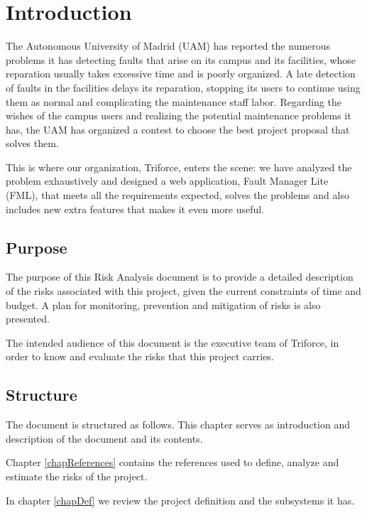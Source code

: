 \documentclass[11pt]{report}
\newcounter{risks}[subsection]
\begin{document}
\newpage
\tableofcontents
\newpage
\chapter{Introduction}


\label{chapIntroduction}

The Autonomous University of Madrid (UAM) has reported the numerous problems it has detecting faults that arise on its campus and its facilities, whose reparation usually takes excessive time and is poorly organized. A late detection of faults in the facilities delays its reparation, stopping its users to continue using them as normal and complicating the maintenance staff labor. Regarding the wishes of the campus users and realizing the potential maintenance problems it has, the UAM has organized a contest to choose the best project proposal that solves them.

This is where our organization, Triforce, enters the scene: we have analyzed the problem exhaustively and designed a web application, Fault Manager Lite (FML), that meets all the requirements expected, solves the problems and also includes new extra features that makes it even more useful.

\section{Purpose}

The purpose of this Risk Analysis document is to provide a detailed description of the risks associated with this project, given the current constraints of time and budget. A plan for monitoring, prevention and mitigation of risks is also presented.

The intended audience of this document is the executive team of Triforce, in order to know and evaluate the risks that this project carries.

\section{Structure}

The document is structured as follows. This chapter serves as introduction and description of the document and its contents.

Chapter \ref{chapReferences} contains the references used to define, analyze and estimate the risks of the project.

In chapter \ref{chapDef} we review the project definition and the subsystems it has.
\end{document}
